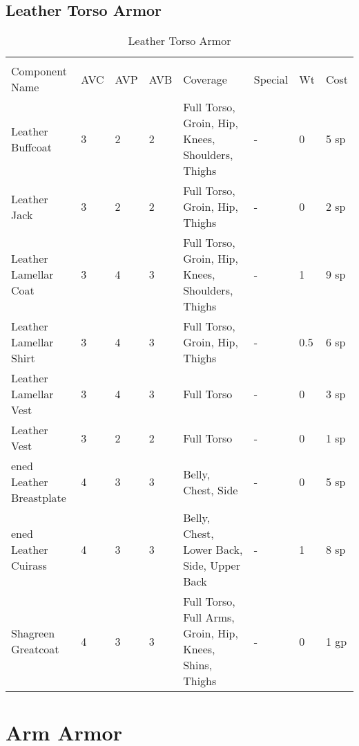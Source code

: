 \documentclass[oneside,11pt,english]{book}
\begin{document}
\subsection{Leather Torso Armor}
\begin{longtabu}to 
	\captionsetup{textformat=empty, labelformat=blank}
	\caption{Leather Torso Armor} \vspace{-15pt}
	\label{tab:Leather Torso Armor}\\
Component Name&AVC&AVP&AVB& Coverage& Special& Wt&Cost\\\toprule
Leather Buffcoat& 3& 2& 2& Full Torso, Groin, Hip, Knees, Shoulders, Thighs &-& 0& 5 sp\\
Leather Jack& 3& 2& 2& Full Torso, Groin, Hip, Thighs &-& 0& 2 sp\\
Leather Lamellar Coat& 3& 4& 3& Full Torso, Groin, Hip, Knees, Shoulders, Thighs &-& 1& 9 sp\\
Leather Lamellar Shirt& 3& 4& 3& Full Torso, Groin, Hip, Thighs &-& 0.5& 6 sp\\
Leather Lamellar Vest& 3& 4& 3& Full Torso &-& 0& 3 sp\\
Leather Vest& 3& 2& 2& Full Torso &-& 0& 1 sp\\
ened Leather Breastplate& 4& 3& 3& Belly, Chest, Side &-& 0& 5 sp\\
ened Leather Cuirass& 4& 3& 3& Belly, Chest, Lower Back, Side, Upper Back &-& 1& 8 sp\\
Shagreen Greatcoat& 4& 3& 3& Full Torso, Full Arms, Groin, Hip, Knees, Shins, Thighs &-& 0& 1 gp\\
\end{longtabu}

\section{Arm Armor}
\end{document}

